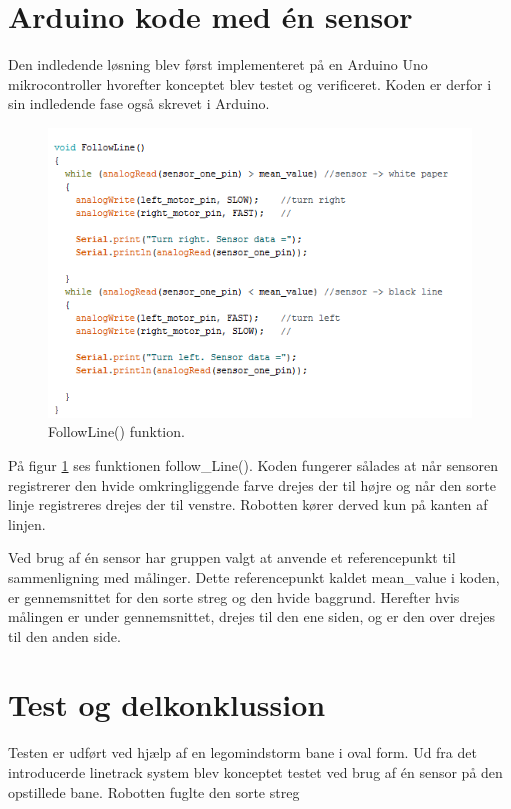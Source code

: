 \section{Arduino kode med én sensor}
Den indledende løsning blev først implementeret på en Arduino Uno mikrocontroller hvorefter konceptet blev testet og verificeret. Koden er derfor i sin indledende fase også skrevet i Arduino.

\begin{figure}[h!]
  \centering
  \includegraphics[width=1.0\textwidth]{figures/followLine2.png}
  \caption{FollowLine() funktion.}
  \label{follow_line_kode}
\end{figure}

På figur \ref{follow_line_kode} ses funktionen follow\_Line(). Koden fungerer sålades at når sensoren registrerer den hvide omkringliggende farve drejes der til højre og når den sorte linje registreres drejes der til venstre. Robotten kører derved kun på kanten af linjen. 

Ved brug af én sensor har gruppen valgt at anvende et referencepunkt til sammenligning med målinger. Dette referencepunkt kaldet mean\_value i koden, er gennemsnittet for den sorte streg og den hvide baggrund. Herefter hvis målingen er under gennemsnittet, drejes til den ene siden, og er den over drejes til den anden side.



\section{Test og delkonklussion}
Testen er udført ved hjælp af en legomindstorm bane i oval form.
Ud fra det introducerde linetrack system blev konceptet testet ved brug af én sensor på den opstillede bane. 
\newline
Robotten fuglte den sorte streg 

